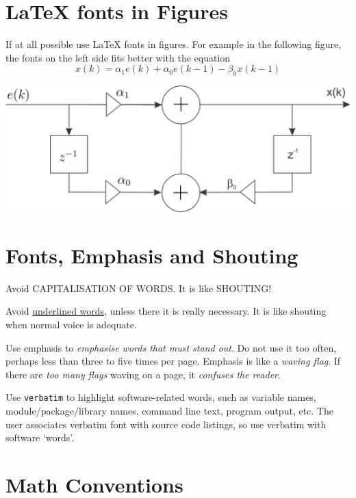 \documentclass[english]{workpackage}[1996/06/02]
\begin{document}
\section{\LaTeX{} fonts in Figures}
\label{sec:LaTeXfontsinFigures}

If at all possible use \LaTeX{} fonts in figures. For example in the following figure, the fonts on the left side fits better with the equation
\begin{equation}
x(k)=\alpha_1 e(k)+\alpha_0 e(k-1)-\beta_0 x(k-1)
\end{equation}
\begin{center}
\includegraphics{images/flow2-zzz.png}
\end{center}
\section{Fonts, Emphasis and Shouting}
\label{sec:FontsEmphasisandShouting}

Avoid CAPITALISATION OF WORDS. It is like SHOUTING!

Avoid \underline{underlined words}, unless there it is really necessary.  It is like shouting when normal voice is adequate.

Use emphasis to \textit{emphasise words that must stand out}.
Do not use it too often, perhaps less than three to five times per page. 
Emphasis is like a \textit{waving flag}. If there are \textit{too many flags} waving on a page, it \textit{confuses the reader}.

Use \lstinline{verbatim} to highlight software-related words, such as variable names, module/package/library names, command line text, program output, etc. 
The user associates verbatim font with source code listings, so use verbatim with software `words'.



\section{Math Conventions}
\label{sec:MathConventions}
\end{document}
